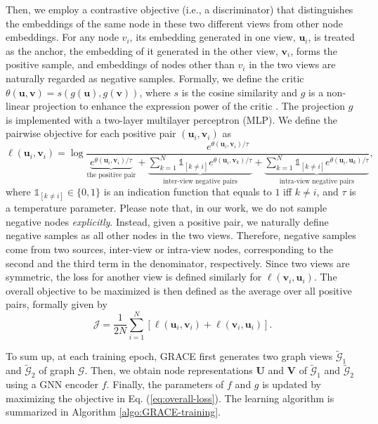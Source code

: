 \documentclass{article}
\theoremstyle{remark}
\begin{document}
Then, we employ a contrastive objective (i.e., a discriminator) that distinguishes the embeddings of the same node in these two different views from other node embeddings. For any node \(v_i\), its embedding generated in one view, \(\bm{u}_i\), is treated as the anchor, the embedding of it generated in the other view, \(\bm{v}_i\), forms the positive sample, and embeddings of nodes other than \(v_i\) in the two views are naturally regarded as negative samples. Formally, we define the critic \(\theta(\bm u, \bm v) = s(g(\bm u), g(\bm v))\), where \(s\) is the cosine similarity and \(g\) is a non-linear projection to enhance the expression power of the critic \cite{Chen:2020wj,Tschannen:2020uo}. The projection \(g\) is implemented with a two-layer multilayer perceptron (MLP). We define the pairwise objective for each positive pair \((\bm{u}_i, \bm{v}_i)\) as
\begin{equation}
	\ell(\bm{u}_i, \bm{v}_i) = \log \frac {e^{\theta\left(\bm{u}_i, \bm{v}_{i} \right) / \tau}} {\underbrace{e^{\theta\left(\bm{u}_i, \bm{v}_{i} \right) / \tau}}_{\text{the positive pair}} + \underbrace{\sum_{k=1}^{N} \mathds{1}_{[k \neq i]} e^{\theta\left(\bm{u}_i, \bm{v}_{k} \right) / \tau}}_{\text{inter-view negative pairs}} + \underbrace{\sum_{k=1}^{N} \mathds{1}_{[k \neq i]} e^{\theta\left(\bm{u}_i, \bm{u}_k \right) / \tau}}_{\text{intra-view negative pairs}}},
\end{equation}
where \(\mathds{1}_{[k \neq i]} \in \{ 0, 1 \}\) is an indication function that equals to \(1\) iff \(k \neq i\), and \(\tau\) is a temperature parameter. Please note that, in our work, we do not sample negative nodes \emph{explicitly}. Instead, given a positive pair, we naturally define negative samples as all other nodes in the two views. Therefore, negative samples come from two sources, inter-view or intra-view nodes, corresponding to the second and the third term in the denominator, respectively. Since two views are symmetric, the loss for another view is defined similarly for \(\ell(\bm{v}_i, \bm u_i)\). 
The overall objective to be maximized is then defined as the average over all positive pairs, formally given by
\begin{equation}
	\mathcal{J} = \frac{1}{2N} \sum_{i = 1}^{N} \left[\ell(\bm{u}_i, \bm{v}_i) + \ell(\bm{v}_i, \bm{u}_i)\right].
	\label{eq:overall-loss}
\end{equation}

To sum up, at each training epoch, GRACE first generates two graph views \(\widetilde{\mathcal G}_1\) and \(\widetilde{\mathcal G}_2\) of graph \(\mathcal G\). Then, we obtain node representations \(\bm{U}\) and \(\bm{V}\) of \(\widetilde{\mathcal{G}}_1\) and \(\widetilde{\mathcal{G}}_2\) using a GNN encoder \(f\). Finally, the parameters of \(f\) and \(g\) is updated by maximizing the objective in Eq. (\ref{eq:overall-loss}). The learning algorithm is summarized in Algorithm \ref{algo:GRACE-training}.
\end{document}

